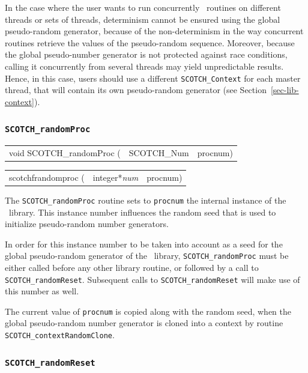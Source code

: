 In the case where the user wants to run concurrently
\libscotch\ routines on different threads or sets of threads,
determinism cannot be ensured using the global pseudo-random
generator, because of the non-determinism in the way concurrent
routines retrieve the values of the pseudo-random sequence. Moreover,
because the global pseudo-number generator is not protected against
race conditions, calling it concurrently from several threads may
yield unpredictable results. Hence, in this case, users should use a
different \texttt{SCOTCH\_\lbt Context} for each master thread, that
will contain its own pseudo-random generator (see
Section~\ref{sec-lib-context}).

\subsubsection{\texttt{SCOTCH\_randomProc}}

\begin{itemize}
\progsyn

{\tt\begin{tabular}{l@{}ll}
void SCOTCH\_randomProc ( & SCOTCH\_Num & procnum)
\end{tabular}}

{\tt\begin{tabular}{l@{}ll}
scotchfrandomproc ( & integer*{\it num} & procnum)
\end{tabular}}

\progdes

The \texttt{SCOTCH\_randomProc} routine sets to \texttt{procnum} the
internal instance of the \libscotch\ library. This instance number
influences the random seed that is used to initialize pseudo-random
number generators.

In order for this instance number to be taken into account as a seed
for the global pseudo-random generator of the \libscotch\ library,
\texttt{SCOTCH\_randomProc} must be either called before any other
library routine, or followed by a call to
\texttt{SCOTCH\_\lbt random\lbt Reset}. Subsequent calls to
\texttt{SCOTCH\_\lbt random\lbt Reset} will make use of this number as
well.

The current value of \texttt{procnum} is copied along with the random
seed, when the global pseudo-random number generator is cloned into a
context by routine \texttt{SCOTCH\_\lbt context\lbt Random\lbt Clone}.

\end{itemize}

\subsubsection{{\tt SCOTCH\_randomReset}}
\label{sec-lib-random-reset}

